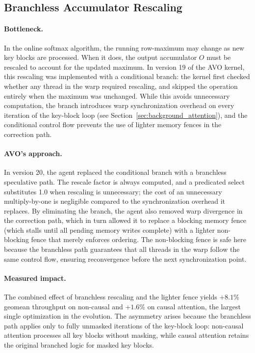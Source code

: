 \documentclass{article}
\begin{document}
\subsection{Branchless Accumulator Rescaling}
\label{sec:analysis_branchless}

\paragraph{Bottleneck.}
In the online softmax algorithm, the running row-maximum may change as new key blocks are processed.
When it does, the output accumulator $O$ must be rescaled to account for the updated maximum.
In version 19 of the AVO kernel, this rescaling was implemented with a conditional branch: the kernel first checked whether any thread in the warp required rescaling, and skipped the operation entirely when the maximum was unchanged.
While this avoids unnecessary computation, the branch introduces warp synchronization overhead on every iteration of the key-block loop (see Section~\ref{sec:background_attention}), and the conditional control flow prevents the use of lighter memory fences in the correction path.

\paragraph{AVO's approach.}
In version 20, the agent replaced the conditional branch with a branchless speculative path.
The rescale factor is always computed, and a predicated select substitutes 1.0 when rescaling is unnecessary; the cost of an unnecessary multiply-by-one is negligible compared to the synchronization overhead it replaces.
By eliminating the branch, the agent also removed warp divergence in the correction path, which in turn allowed it to replace a blocking memory fence (which stalls until all pending memory writes complete) with a lighter non-blocking fence that merely enforces ordering.
The non-blocking fence is safe here because the branchless path guarantees that all threads in the warp follow the same control flow, ensuring reconvergence before the next synchronization point.

\paragraph{Measured impact.}
The combined effect of branchless rescaling and the lighter fence yields $+8.1\%$ geomean throughput on non-causal and $+1.6\%$ on causal attention, the largest single optimization in the evolution.
The asymmetry arises because the branchless path applies only to fully unmasked iterations of the key-block loop: non-causal attention processes all key blocks without masking, while causal attention retains the original branched logic for masked key blocks.
\end{document}
